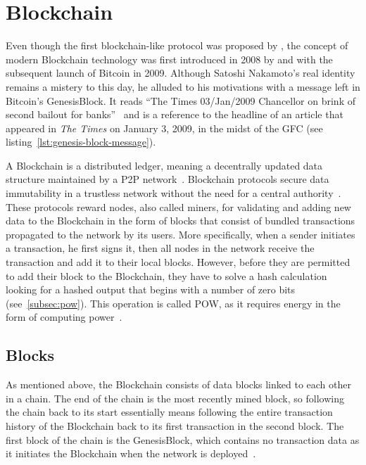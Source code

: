 \section{Blockchain}\label{sec:blockchain}

Even though the first blockchain-like protocol was proposed by \textcite{chaum_computer_1982}, the concept of modern \gls{Blockchain} technology was first introduced in 2008 by \textcite{nakamoto_bitcoin_2008} and with the subsequent launch of Bitcoin in 2009.
Although Satoshi Nakamoto's real identity remains a mistery to this day, he alluded to his motivations with a message left in Bitcoin's \gls{GenesisBlock}.
It reads \enquote{The Times 03/Jan/2009 Chancellor on brink of second bailout for banks}~\autocite{nakamoto_bitcoin_2009} and is a reference to the headline of an article that appeared in \emph{The Times} on January 3, 2009, in the midst of the \gls{GFC} (see listing~\ref{lst:genesis-block-message}).


A \gls{Blockchain} is a distributed ledger, meaning a decentrally updated data structure maintained by a \gls{P2P} network~\autocites[3]{crosby_blockchain_2015}[1]{nakamoto_bitcoin_2008}.
\Gls{Blockchain} protocols secure data immutability in a trustless network without the need for a central authority~\autocites[3]{crosby_blockchain_2015}[4]{jafar_blockchain_2021}.
These protocols reward nodes, also called miners, for validating and adding new data to the \gls{Blockchain} in the form of blocks that consist of bundled transactions propagated to the network by its users.
More specifically, when a sender initiates a transaction, he first signs it, then all nodes in the network receive the transaction and add it to their local blocks.
However, before they are permitted to add their block to the \gls{Blockchain}, they have to solve a hash calculation looking for a hashed output that begins with a number of zero bits (see~\cref{subsec:pow}).
This operation is called \gls{POW}, as it requires energy in the form of computing power~\autocite[3]{nakamoto_bitcoin_2008}.

\subsection{Blocks}\label{subsec:blocks}

As mentioned above, the \gls{Blockchain} consists of data blocks linked to each other in a chain.
The end of the chain is the most recently mined block, so following the chain back to its start essentially means following the entire transaction history of the \gls{Blockchain} back to its first transaction in the second block.
The first block of the chain is the \gls{GenesisBlock}, which contains no transaction data as it initiates the \gls{Blockchain} when the network is deployed~\autocites[162]{antonopoulos_mastering_2017}[31]{antonopoulos_mastering_2019}.

